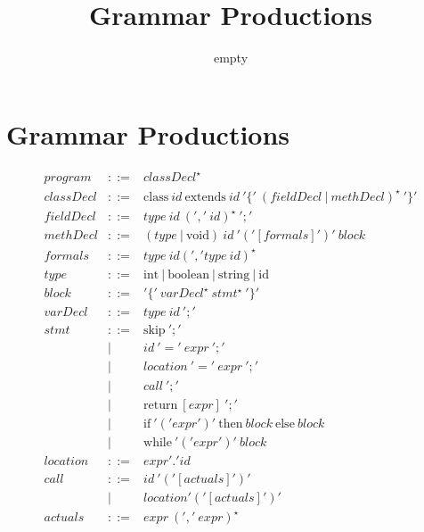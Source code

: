 \documentclass{article}
\title{Grammar Productions}
\author{empty}
\begin{document}
\maketitle %

%	

\section{Grammar Productions}
$$
\begin{array}{rcl}
 program & ::= & classDecl ^{\star} \\
 classDecl & ::= & \textrm{class} ~id~ \textrm{extends} ~id~ '\{'~( fieldDecl ~|~  methDecl)^{\star} ~'\}'  \\
 fieldDecl & ::= & type~id ~(',' ~id)^{\star} ~';' \\
 methDecl & ::= & (type~|~\textrm{void})~id~ '('[formals]')'~ block \\
 formals & ::= & type~id (',' type~id)^{\star} \\
 type & ::= & \textrm{int}~|~\textrm{boolean}~|~\textrm{string}~|~\textrm{id}\\
 block & ::= & '\{'~varDecl^{\star} ~stmt^{\star}~'\}' \\
 varDecl & ::= & type~id ~';' \\
 stmt & ::= & \textrm{skip} ~';'\\
 & | & id ~'='~ expr ~';'\\
 & | & location ~'='~ expr ~';'\\
 & | & call ~';'\\
 & | & \textrm{return} ~[expr] ~';'\\
 & | & \textrm{if} ~'('expr')' ~\textrm{then} ~block ~\textrm{else} ~block \\
 & | & \textrm{while} ~'('expr')' ~block\\
 location & ::= & expr'.'id\\
 call & ::= & id~'('[actuals]')'\\
 & | & location'('[actuals]')' \\
 actuals & ::= & expr ~(','~expr)^{\star}\\

\end{array}$$
\end{document}
